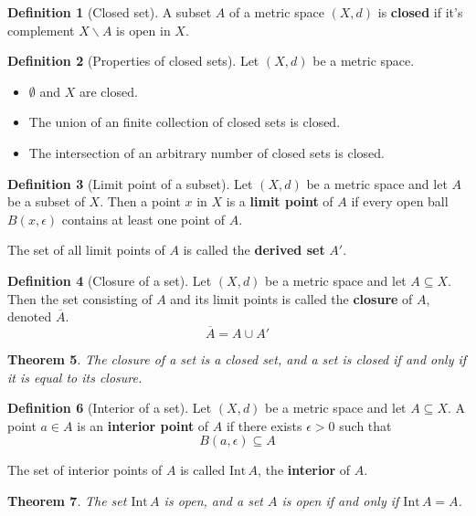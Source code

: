 \documentclass[10pt, oneside, reqno]{amsart}
\theoremstyle{plain}%
\newtheorem{thm}{Theorem}[section]
\theoremstyle{definition}
\newtheorem{defn}[thm]{Definition}
\theoremstyle{remark}
\newcommand{\met}{(X,d)}
\newcommand{\intr}{\text{Int}\,}
\newcommand{\ol}[1]{\overline{#1}}
\begin{document}
\begin{defn}[Closed set]
    A subset $A$ of a metric space $\met$ is \textbf{closed} if it's complement $X \backslash A$ is open in $X$.
\end{defn}

\begin{defn}[Properties of closed sets]
    Let $\met$ be a metric space.
    \begin{itemize}
        \item $\emptyset$ and $X$ are closed.
        \item The union of an finite collection of closed sets is closed.
        \item The intersection of an arbitrary number of closed sets is closed.
    \end{itemize}
\end{defn}

\begin{defn}[Limit point of a subset]
    Let $\met$ be a metric space and let $A$ be a subset of $X$.  Then a point $x$ in $X$ is a \textbf{limit point} of $A$ if every open ball $B(x, \epsilon)$ contains at least one point of $A$.
    
    The set of all limit points of $A$ is called the \textbf{derived set} $A'$.
\end{defn}

\begin{defn}[Closure of a set]
    Let $\met$ be a metric space and let $A \subseteq X$.  Then the set consisting of $A$ and its limit points is called the \textbf{closure} of $A$, denoted $\ol{A}$.  \[
        \ol{A} = A \cup A'
    \]
\end{defn}

\begin{thm}
    The closure of a set is a closed set, and a set is closed if and only if it is equal to its closure.
\end{thm}

\begin{defn}[Interior of a set]
    Let $\met$ be a metric space and let $A \subseteq X$.  A point $a \in A$ is an \textbf{interior point} of $A$ if there exists $\epsilon > 0$ such that \[
        B(a, \epsilon) \subseteq A
    \]
    
    The set of interior points of $A$ is called $\intr A$, the \textbf{interior} of $A$.
\end{defn}

\begin{thm}
    The set $\intr A$ is open, and a set $A$ is open if and only if $\intr A = A$.
\end{thm}
\end{document}
